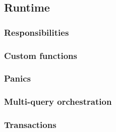 
\subsection{Runtime}

\subsubsection{Responsibilities}

\subsubsection{Custom functions}

\subsubsection{Panics}

\subsubsection{Multi-query orchestration}

\subsubsection{Transactions}

